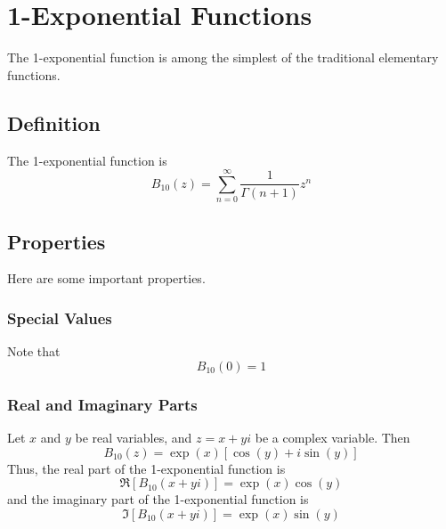 \chapter{1-Exponential Functions}
The 1-exponential function is among the simplest of the traditional elementary functions.
\section{Definition}
The 1-exponential function is
\begin{equation}
    B_{10}(z) = \sum_{n = 0}^{\infty} \frac{1}{\Gamma(n+1)} z^{n}
\end{equation}
\section{Properties}
Here are some important properties.
\subsection{Special Values}
Note that
\begin{equation}
    B_{10}(0) = 1
\end{equation}
\subsection{Real and Imaginary Parts}
Let $x$ and $y$ be real variables, and $z = x + y i$ be a complex variable. Then
\begin{equation}
    B_{10}(z) = \exp({x}) \left[ \cos(y) + i \sin(y) \right]
\end{equation}
Thus, the real part of the 1-exponential function is
\begin{equation}
    \Re\left[ B_{10}(x + y i) \right] = \exp({x}) \cos(y)
\end{equation}
and the imaginary part of the 1-exponential function is
\begin{equation}
    \Im\left[ B_{10}(x + y i) \right] = \exp({x}) \sin(y)
\end{equation}
